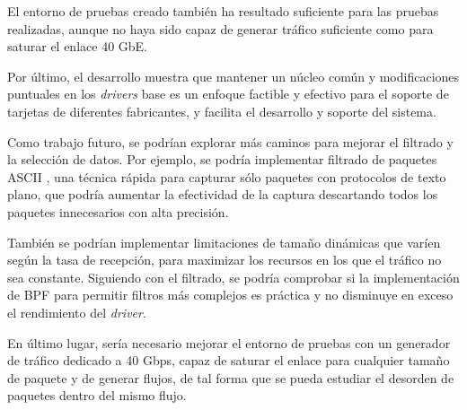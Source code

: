 \documentclass[twoside, 12pt, draft]{epstfg}
\begin{document}
El entorno de pruebas creado también ha resultado suficiente para las pruebas realizadas, aunque no haya sido capaz de generar tráfico suficiente como para saturar el enlace 40 GbE.

Por último, el desarrollo muestra que mantener un núcleo común y modificaciones puntuales en los \textit{drivers} base es un enfoque factible y efectivo para el soporte de tarjetas de diferentes fabricantes, y facilita el desarrollo y soporte del sistema.

Como trabajo futuro, se podrían explorar más caminos para mejorar el filtrado y la selección de datos. Por ejemplo, se podría implementar filtrado de paquetes ASCII \cite{ucedaselective}, una técnica rápida para capturar sólo paquetes con protocolos de texto plano, que podría aumentar la efectividad de la captura descartando todos los paquetes innecesarios con alta precisión.

También se podrían implementar limitaciones de tamaño dinámicas que varíen según la tasa de recepción, para maximizar los recursos en los que el tráfico no sea constante. Siguiendo con el filtrado, se podría comprobar si la implementación de \gls{BPF} para permitir filtros más complejos es práctica y no disminuye en exceso el rendimiento del \textit{driver}.

En último lugar, sería necesario mejorar el entorno de pruebas con un generador de tráfico dedicado a 40 Gbps, capaz de saturar el enlace para cualquier tamaño de paquete y de generar flujos, de tal forma que se pueda estudiar el desorden de paquetes dentro del mismo flujo.

\backmatter
\appendix

\printnoidxglossaries
\cleardoublepage

\nocite{*}
{}

\cleardoublepage
\printindex
\end{document}
